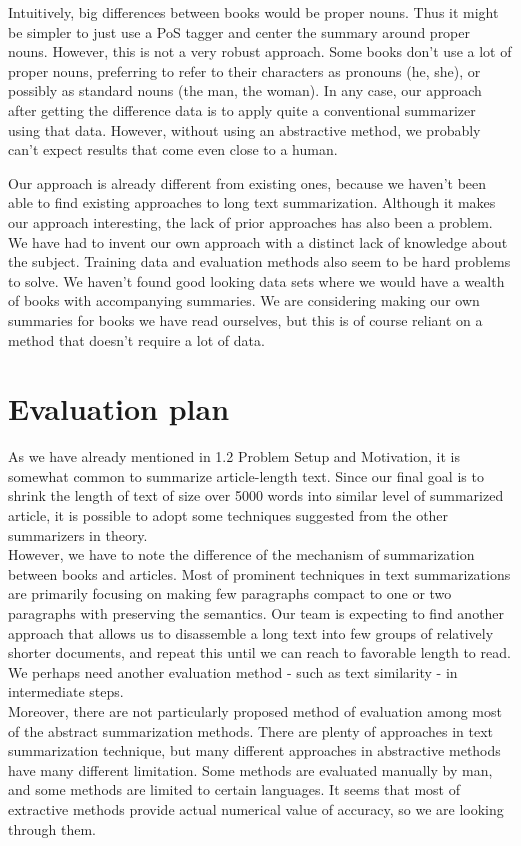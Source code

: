 Intuitively, big differences between books would be proper nouns. Thus it might
be simpler to just use a PoS tagger and center the summary around proper nouns.
However, this is not a very robust approach. Some books don't use a lot of
proper nouns, preferring to refer to their characters as pronouns (he, she), or
possibly as standard nouns (the man, the woman).  In any case, our approach
after getting the difference data is to apply quite a conventional summarizer
using that data. However, without using an abstractive method, we probably
can't expect results that come even close to a human.

Our approach is already different from existing ones, because we haven't been
able to find existing approaches to long text summarization.  Although it makes
our approach interesting, the lack of prior approaches has also been a problem.
We have had to invent our own approach with a distinct lack of knowledge about
the subject. Training data and evaluation methods also seem to be hard problems
to solve. We haven't found good looking data sets where we would have a wealth
of books with accompanying summaries. We are considering making our own
summaries for books we have read ourselves, but this is of course reliant on a
method that doesn't require a lot of data.


\section{Evaluation plan}

As we have already mentioned in 1.2 Problem Setup and Motivation, it is somewhat common to summarize article-length text. Since our final goal is to shrink the length of text of size over 5000 words into similar level of summarized article, it is possible to adopt some techniques suggested from the other summarizers in theory. \\
However, we have to note the difference of the mechanism of summarization between books and articles. Most of prominent techniques in text summarizations are primarily focusing on making few paragraphs compact to one or two paragraphs with preserving the semantics. Our team is expecting to find another approach that allows us to disassemble a long text into few groups of relatively shorter documents, and repeat this until we can reach to favorable length to read. We perhaps need another evaluation method - such as text similarity \cite{Do2010RobustLA} - in intermediate steps. \\
Moreover, there are not particularly proposed method of evaluation among most of the abstract summarization methods. There are plenty of approaches in text summarization technique, but many different approaches in abstractive methods have many different limitation. Some methods are evaluated manually by man, and some methods are limited to certain languages. It seems that most of extractive methods provide actual numerical value of accuracy, so we are looking through them.

